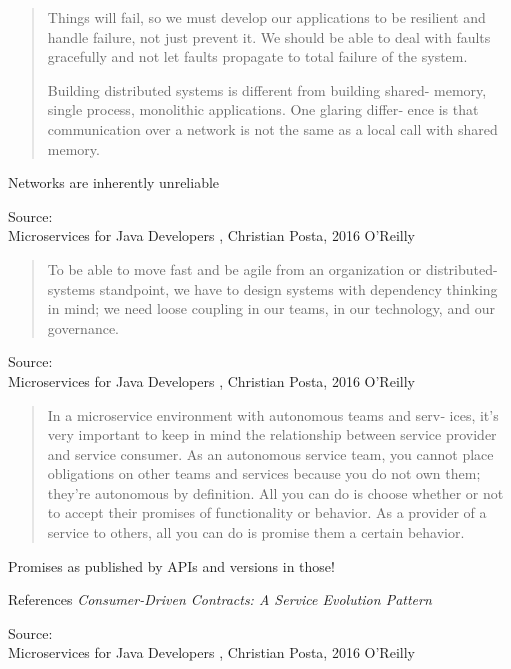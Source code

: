 \documentclass[Screen16to9,17pt]{foils}
\begin{document}

\begin{quote}
  Things will fail, so we must develop our applications to be resilient and handle failure, not just prevent it. We should
  be able to deal with faults gracefully and not let faults propagate to
  total failure of the system.

  Building distributed systems is different from building shared-
memory, single process, monolithic applications. One glaring differ‐
ence is that communication over a network is not the same as a local
call with shared memory.
\end{quote}

\begin{list2}
\item Networks are inherently unreliable
\end{list2}
Source: {\footnotesize\\
Microservices for Java Developers , Christian Posta, 2016 O’Reilly}



\begin{quote}
  To be able to move fast and be agile from an organization or
  distributed-systems standpoint, we have to design systems with
  dependency thinking in mind; we need loose coupling in our teams,
  in our technology, and our governance.
\end{quote}

Source: {\footnotesize\\
Microservices for Java Developers , Christian Posta, 2016 O’Reilly}




\begin{quote}
  In a microservice environment with autonomous teams and serv‐
  ices, it’s very important to keep in mind the relationship between
  service provider and service consumer. As an autonomous service
  team, you cannot place obligations on other teams and services
  because you do not own them; they’re autonomous by definition. All
  you can do is choose whether or not to accept their promises of
  functionality or behavior. As a provider of a service to others, all you
  can do is promise them a certain behavior.
\end{quote}

\begin{list2}
\item Promises as published by APIs and versions in those!
\item References \emph{Consumer-Driven Contracts: A Service Evolution Pattern}\\
\end{list2}
Source: {\footnotesize\\
Microservices for Java Developers , Christian Posta, 2016 O’Reilly}
\end{document}
